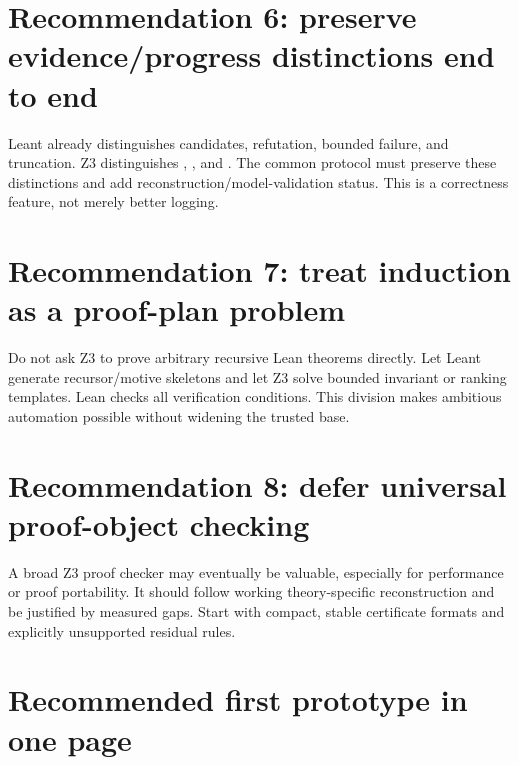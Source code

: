 \documentclass[11pt,letterpaper,openany]{report}
\newcommand{\code}[1]{\texttt{\detokenize{#1}}}
\begin{document}
\section{Recommendation 6: preserve evidence/progress distinctions end to end}

Leant already distinguishes candidates, refutation, bounded failure, and truncation.
Z3 distinguishes \code{sat}, \code{unsat}, and \code{unknown}. The common protocol
must preserve these distinctions and add reconstruction/model-validation status. This
is a correctness feature, not merely better logging.

\section{Recommendation 7: treat induction as a proof-plan problem}

Do not ask Z3 to prove arbitrary recursive Lean theorems directly. Let Leant generate
recursor/motive skeletons and let Z3 solve bounded invariant or ranking templates.
Lean checks all verification conditions. This division makes ambitious automation
possible without widening the trusted base.

\section{Recommendation 8: defer universal proof-object checking}

A broad Z3 proof checker may eventually be valuable, especially for performance or
proof portability. It should follow working theory-specific reconstruction and be
justified by measured gaps. Start with compact, stable certificate formats and
explicitly unsupported residual rules.

\section{Recommended first prototype in one page}
\end{document}
